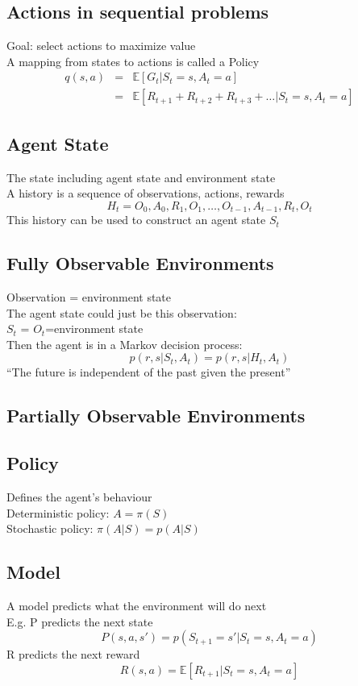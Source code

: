 \subsection*{Actions in sequential problems}
Goal: select actions to maximize value \\
A mapping from states to actions is called a Policy
\begin{eqnarray*}
q(s,a) &=& \mathbb{E}[G_t|S_t=s,A_t=a] \\
&=& \mathbb{E}[R_{t+1}+R_{t+2}+R_{t+3}+\ldots|S_t=s,A_t=a]
\end{eqnarray*}

\subsection*{Agent State}
The state including agent state and environment state\\
A history is a sequence of observations, actions, rewards
$$
H_t = O_0,A_0,R_1,O_1,\ldots,O_{t-1},A_{t-1},R_t,O_t
$$
This history can be used to construct an agent state $S_{t}$

\subsection*{Fully Observable Environments}
Observation = environment state\\
The agent state could just be this observation:\\
$S_{t}$ = $O_{t}$=environment state \\
Then the agent is in a Markov decision process:
$$
p(r,s|S_t,A_t) = p(r,s|H_t,A_t)
$$
``The future is independent of the past given the present''

\subsection*{Partially Observable Environments}

\subsection*{Policy}
Defines the agent's behaviour\\
Deterministic policy: $A=\pi(S)$\\
Stochastic policy: $\pi(A|S)=p(A|S)$

\subsection*{Model}
A model predicts what the environment will do next\\
E.g. P predicts the next state 
$$
P(s,a,s') = p(S_{t+1}=s'|S_t=s,A_t=a)
$$
R predicts the next reward
$$
R(s,a) = \mathbb{E}[R_{t+1}|S_t=s,A_t=a]
$$